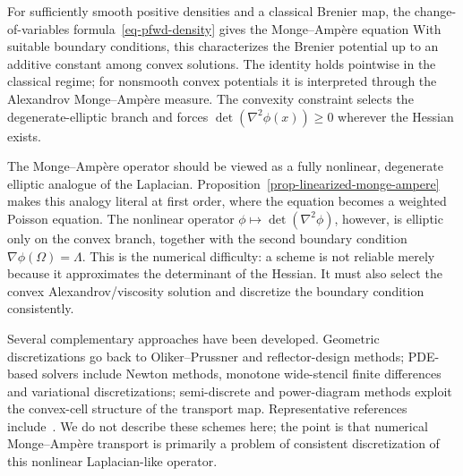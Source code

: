 For sufficiently smooth positive densities and a classical Brenier map, the change-of-variables formula~\eqref{eq-pfwd-density} gives the Monge--Amp\`ere equation
With suitable boundary conditions, this characterizes the Brenier potential up to an additive constant among convex solutions. The identity holds pointwise in the classical regime; for nonsmooth convex potentials it is interpreted through the Alexandrov Monge--Amp\`ere measure. The convexity constraint selects the degenerate-elliptic branch and forces $\det(\nabla^2\phi(x))\geq0$ wherever the Hessian exists.

\begin{rem}
	The Monge--Amp\`ere operator should be viewed as a fully nonlinear, degenerate elliptic analogue of the Laplacian. Proposition~\ref{prop-linearized-monge-ampere} makes this analogy literal at first order, where the equation becomes a weighted Poisson equation. The nonlinear operator $\phi\mapsto\det(\nabla^2\phi)$, however, is elliptic only on the convex branch, together with the second boundary condition $\nabla\phi(\Omega)=\Lambda$. This is the numerical difficulty: a scheme is not reliable merely because it approximates the determinant of the Hessian. It must also select the convex Alexandrov/viscosity solution and discretize the boundary condition consistently.

	Several complementary approaches have been developed. Geometric discretizations go back to Oliker--Prussner and reflector-design methods; PDE-based solvers include Newton methods, monotone wide-stencil finite differences and variational discretizations; semi-discrete and power-diagram methods exploit the convex-cell structure of the transport map. Representative references include~\cite{oliker1989numerical,caffarelli1999problem,Loeper:2005fn,benamou2014numerical,froese2011convergent,benamou2016monotone,mirebeau2015discretization,sulman2011efficient}. We do not describe these schemes here; the point is that numerical Monge--Amp\`ere transport is primarily a problem of consistent discretization of this nonlinear Laplacian-like operator.
\end{rem}


